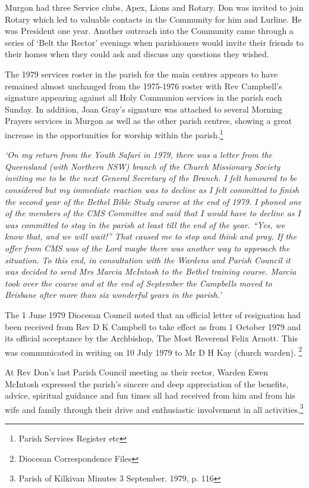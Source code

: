 Murgon had three Service clubs, Apex, Lions and Rotary. Don was invited to join Rotary which led to valuable contacts in the Community for him and Lurline. He was President one year. Another outreach into the Community came through a series of `Belt the Rector' evenings when parishioners would invite their friends to their homes when they could ask and discuss any questions they wished.



The 1979 services roster in the parish for the main centres appears to have remained almost unchanged from the 1975-1976 roster with Rev Campbell's signature appearing against all Holy Communion services in the parish each Sunday. In addition, Joan Gray's signature was attached to several Morning Prayers services in Murgon as well as the other parish centres, showing a great increase in the opportunities for worship within the parish.\footnote{Parish Services Register etc}


\emph{`On my return from the Youth Safari in 1979, there was a letter from the Queensland (with Northern NSW) branch of the Church Missionary Society inviting me to be the next General Secretary of the Branch. I felt honoured to be considered but my immediate reaction was to decline as I felt committed to finish the second year of the Bethel Bible Study course at the end of 1979. I phoned one of the members of the CMS Committee and said that I would have to decline as I was committed to stay in the parish at least till the end of the year. ``Yes, we know that, and we will wait!'' That caused me to stop and think and pray. If the offer from CMS was of the Lord maybe there was another way to approach the situation. To this end, in consultation with the Wardens and Parish Council it was decided to send Mrs Marcia McIntosh to the Bethel training course. Marcia took over the course and at the end of September the Campbells moved to Brisbane after more than six wonderful years in the parish.'}



The 1 June 1979 Diocesan Council noted that an official letter of resignation had been received from Rev D K Campbell to take effect as from 1 October 1979 and its official acceptance by the Archbishop, The Most Reverend Felix Arnott. This was communicated in writing on 10 July 1979 to Mr D H Kay (church warden). \footnote{Diocesan Correspondence Files}


At Rev Don's last Parish Council meeting as their rector, Warden Ewen McIntosh expressed the parish's sincere and deep appreciation of the benefits, advice, spiritual guidance and fun times all had received from him and from his wife and family through their drive and enthusiastic involvement in all activities.\footnote{Parish of Kilkivan Minutes 3 September. 1979, p. 116}


